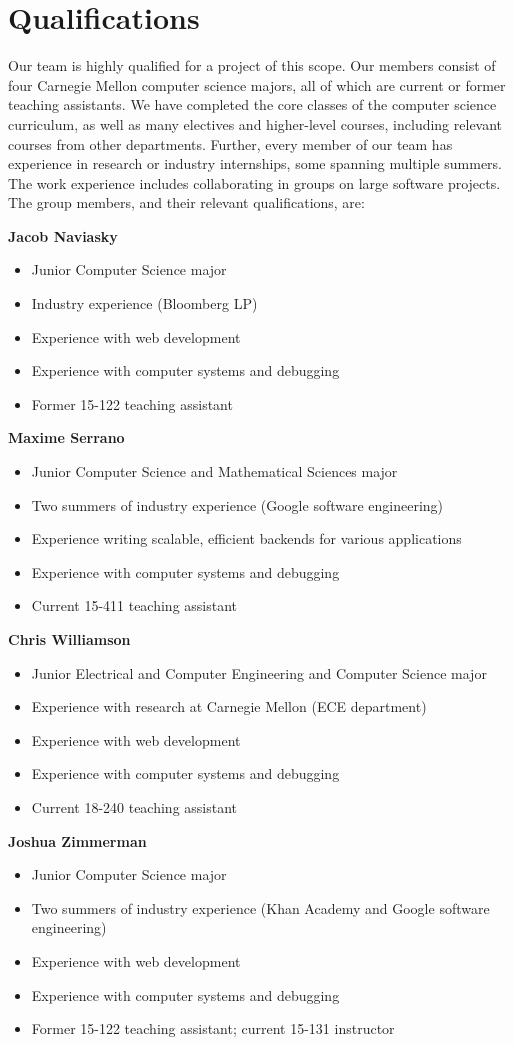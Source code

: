 \section{Qualifications}
Our team is highly qualified for a project of this
scope. Our members consist of four Carnegie
Mellon computer science majors, all of which 
are current or former teaching assistants.
We have completed the core classes of the computer
science curriculum, as well as many electives and
higher-level courses, including relevant
courses from other departments.
Further, every member of our team has experience
in research or industry internships, some spanning
multiple summers. The
work experience includes collaborating in groups
on large software projects.
The group members, and their relevant qualifications,
are:

{\bf Jacob Naviasky}
\begin{itemize}
\item Junior Computer Science major
\item Industry experience (Bloomberg LP)
\item Experience with web development
\item Experience with computer systems and debugging
\item Former 15-122 teaching assistant
\end{itemize}

{\bf Maxime Serrano}
\begin{itemize}
\item Junior Computer Science and Mathematical Sciences major
\item Two summers of industry experience (Google software engineering)
\item Experience writing scalable, efficient backends for various applications
\item Experience with computer systems and debugging
\item Current 15-411 teaching assistant
\end{itemize}

{\bf Chris Williamson}
\begin{itemize}
\item Junior Electrical and Computer Engineering and Computer Science major
\item Experience with research at Carnegie Mellon (ECE department)
\item Experience with web development
\item Experience with computer systems and debugging
\item Current 18-240 teaching assistant
\end{itemize}

{\bf Joshua Zimmerman}
\begin{itemize}
\item Junior Computer Science major
\item Two summers of industry experience (Khan Academy and Google software engineering)
\item Experience with web development
\item Experience with computer systems and debugging
\item Former 15-122 teaching assistant; current 15-131 instructor
\end{itemize}